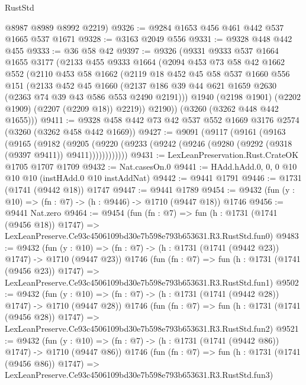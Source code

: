 \begin{lexlean}{RustStd}
\begin{coremodule}
      @8987
      @8989
      @8992
      @2219)
@9326 := @9284 @1653 @456 @461 @442 @537 @1665 @537 @1671
@9328 := @3163 @2049 @556
@9331 := @9328 @448 @442 @455
@9333 := @36 @58 @42
@9397 := @9326
    (@9331
      @9333
      @537
      @1664
      @1655
      @3177
      (@2133
        @455
        @9333
        @1664
        (@2094
          @453
          @73
          @58
          @42
          @1662
          @552
          (@2110
            @453
            @58
            @1662
            (@2119
              @18
              @452
              @45
              @58
              @537
              @1660
              @556
              @151
              (@2133
                @452
                @45
                @1660
                (@2137 @186 @39 @44 @621 @1659 @2630 (@2363 @74 @39 @43 @586 @553 @2490 @2191)))
              @1940
              (@2198 @1901)
              (@2202 @1909)
              (@2207 (@2209 @18))
              @2219))
          @2190))
      (@3260 (@3262 @448 @442 @1655)))
@9411 := @9328 @458 @442 @73 @42 @537 @552 @1669 @3176 @2574 (@3260 (@3262 @458 @442 @1669))
@9427 := @9091
    (@9117
      (@9161
        (@9163
          (@9165
            (@9182
              (@9205
                (@9220 (@9233 (@9242 (@9246 (@9280 (@9292 (@9318 (@9397 @9411)) @9411))))))))))))
@9431 := LexLeanPreservation.Rust.CrateOK @1705 @1707 @1709
@9432 := Nat.casesOn.{0}
@9441 := HAdd.hAdd.{0, 0, 0} @10 @10 @10 (instHAdd.{0} @10 instAddNat)
@9442 := @9441 @1791
@9446 := @1731 (@1741 (@9442 @18)) @1747
@9447 := @9441 @1789
@9454 := @9432 (fun (y : @10) => (fn : @7) -> (h : @9446) -> @1710 (@9447 @18)) @1746
@9456 := @9441 Nat.zero
@9464 := @9454
    (fun (fn : @7) =>
    fun (h : @1731 (@1741 (@9456 @18)) @1747) =>
    LexLeanPreserve.Ce93c4506109bd30e7b598e793b653631.R3.RustStd.fun0)
@9483 := @9432
    (fun (y : @10) => (fn : @7) -> (h : @1731 (@1741 (@9442 @23)) @1747) -> @1710 (@9447 @23))
    @1746
    (fun (fn : @7) =>
    fun (h : @1731 (@1741 (@9456 @23)) @1747) =>
    LexLeanPreserve.Ce93c4506109bd30e7b598e793b653631.R3.RustStd.fun1)
@9502 := @9432
    (fun (y : @10) => (fn : @7) -> (h : @1731 (@1741 (@9442 @28)) @1747) -> @1710 (@9447 @28))
    @1746
    (fun (fn : @7) =>
    fun (h : @1731 (@1741 (@9456 @28)) @1747) =>
    LexLeanPreserve.Ce93c4506109bd30e7b598e793b653631.R3.RustStd.fun2)
@9521 := @9432
    (fun (y : @10) => (fn : @7) -> (h : @1731 (@1741 (@9442 @86)) @1747) -> @1710 (@9447 @86))
    @1746
    (fun (fn : @7) =>
    fun (h : @1731 (@1741 (@9456 @86)) @1747) =>
    LexLeanPreserve.Ce93c4506109bd30e7b598e793b653631.R3.RustStd.fun3)

\end{coremodule}
\end{lexlean}
